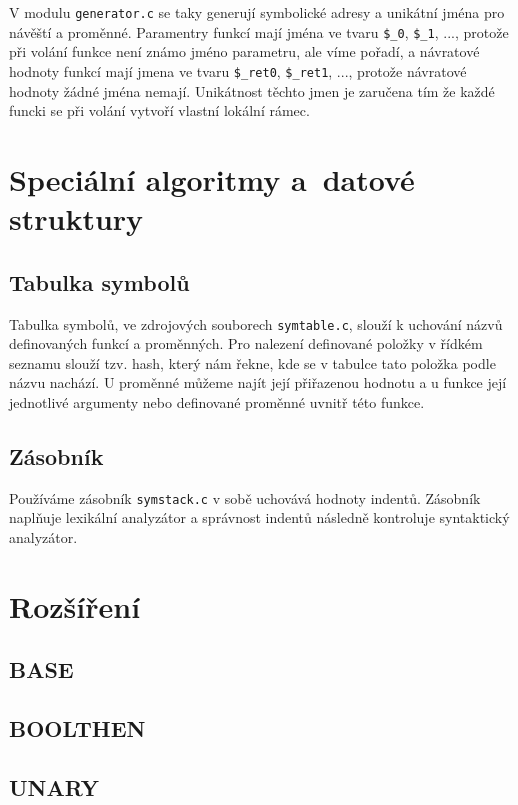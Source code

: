 \documentclass[a4paper, 11pt]{article}
\begin{document}
	V modulu \texttt{generator.c} se taky generují symbolické adresy a unikátní jména pro návěští a proměnné. Paramentry funkcí mají
	jména ve tvaru \texttt{\$\_0}, \texttt{\$\_1}, ..., protože při volání funkce není známo jméno parametru, ale víme pořadí, a návratové hodnoty funkcí mají jmena
	ve tvaru \texttt{\$\_ret0}, \texttt{\$\_ret1}, ..., protože návratové hodnoty žádné jména nemají. Unikátnost těchto jmen je zaručena tím že každé funcki se při volání vytvoří
	vlastní lokální rámec.



	\section{Speciální algoritmy a~datové struktury}
	
	\subsection{Tabulka symbolů}
    Tabulka symbolů, ve zdrojových souborech \verb|symtable.c|, slouží k uchování názvů definovaných funkcí a proměnných. Pro nalezení definované položky v řídkém seznamu slouží tzv. hash, který nám řekne, kde se v tabulce tato položka podle názvu nachází. U proměnné můžeme najít její přiřazenou hodnotu a u funkce její jednotlivé argumenty nebo definované proměnné uvnitř této funkce.

    \subsection{Zásobník}
    Používáme zásobník \verb|symstack.c|  v sobě uchovává hodnoty indentů. Zásobník naplňuje lexikální analyzátor a správnost indentů následně kontroluje syntaktický analyzátor.

    \section{Rozšíření}
    \subsection{BASE}
    
    \subsection{BOOLTHEN}
     
    \subsection{UNARY}
\end{document}

